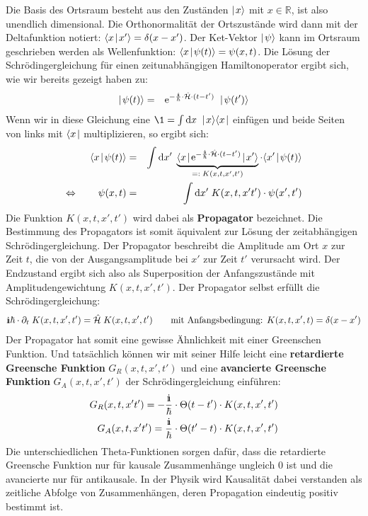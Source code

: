 Die Basis des Ortsraum besteht aus den Zuständen $\mid\!\!\!\,\,{x}\rangle$ mit $x\in\mathbb{R}$, ist also unendlich dimensional. Die Orthonormalität der Ortszustände wird dann mit der Deltafunktion notiert: $\langle{x}\!\!\!\,\,\mid\!\!\!\,\,{x'}\rangle=\delta(x-x')$. Der Ket-Vektor $\mid\!\!\!\,\,{\psi}\rangle$ kann im Ortsraum geschrieben werden als Wellenfunktion: $\langle{x}\!\!\!\,\,\mid\!\!\!\,\,{\psi(t)}\rangle=\psi(x,t)$. Die Lösung der Schrödingergleichung für einen zeitunabhängigen Hamiltonoperator ergibt sich, wie wir bereits gezeigt haben zu: 
\begin{eqnarray*} 
	\ket{\psi(t)} &=& \e^{-\frac{\I}{\hbar}\cdot \hat{\ham}\cdot(t-t')}\; \ket{\psi(t')}
\end{eqnarray*} 
Wenn wir in diese Gleichung eine $\1=\int \mathrm{d}x\;\ket{x}\bra{x}$ einfügen und beide Seiten von links mit $\langle{x}\!\!\!\,\,\mid$ multiplizieren, so ergibt sich:
\begin{eqnarray}
	\braket{x}{\psi(t)} &=& \int\mathrm{d}x'\; \underbrace{\bracket{x}{\e^{-\frac{\I}{\hbar}\cdot\hat{\ham}\cdot(t-t')}}{x'}}_{=:\;K(x,t,x',t')} \cdot \braket{x'}{\psi(t)} \nonumber
	\\
	\Leftrightarrow\qquad \psi(x,t) &=& \int\mathrm{d}x'\; K(x,t,x't') \cdot\psi(x',t') \label{PropagatorDynamik}
\end{eqnarray}
Die Funktion $K(x,t,x',t')$ wird dabei als {\bf Propagator} bezeichnet. Die Bestimmung des Propagators ist somit äquivalent zur Lösung der zeitabhängigen Schrödingergleichung. Der Propagator beschreibt die Amplitude am Ort $x$ zur Zeit $t$, die von der Ausgangsamplitude bei $x'$ zur Zeit $t'$ verursacht wird. Der Endzustand ergibt sich also als Superposition der Anfangszustände mit Amplitudengewichtung $K(x,t,x',t')$. Der Propagator selbst erfüllt die Schrödingergleichung:
\begin{eqnarray*} 
	\I\hbar\cdot\dell_t\;K(x,t,x',t') = \hat{\ham}\;K(x,t,x',t') &\quad& \text{mit Anfangsbedingung: } K(x,t,x',t) = \delta(x-x')
\end{eqnarray*} 
Der Propagator hat somit eine gewisse Ähnlichkeit mit einer Greenschen Funktion. Und tatsächlich können wir mit seiner Hilfe leicht eine {\bf retardierte Greensche Funktion} $G_R(x,t,x',t')$ und eine {\bf avancierte Greensche Funktion} $G_A(x,t,x',t')$ der Schrödingergleichung einführen: 
\begin{eqnarray*}
	G_R(x,t,x't') = -\frac{\I}{\hbar}\cdot\Theta(t-t')\cdot K(x,t,x',t')
	\\
	G_A(x,t,x't') = \frac{\I}{\hbar}\cdot\Theta(t'-t)\cdot K(x,t,x',t')
\end{eqnarray*}
Die unterschiedlichen Theta-Funktionen sorgen dafür, dass die retardierte Greensche Funktion nur für kausale Zusammenhänge ungleich 0 ist und die avancierte nur für antikausale. In der Physik wird Kausalität dabei verstanden als zeitliche Abfolge von Zusammenhängen, deren Propagation eindeutig positiv bestimmt ist. 

